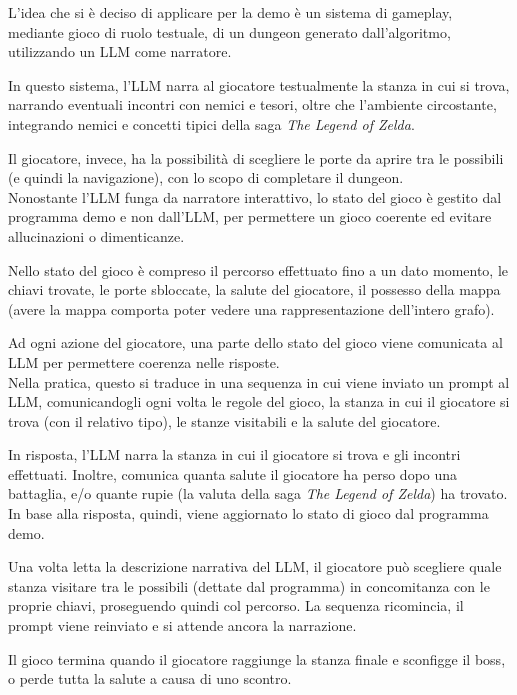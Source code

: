 \documentclass[12pt,titlepage]{article}
\begin{document}
\noindent L'idea che si è deciso di applicare per la demo è un sistema di gameplay, mediante gioco di ruolo testuale, di un dungeon generato dall'algoritmo, utilizzando un LLM come narratore.

In questo sistema, l'LLM narra al giocatore testualmente la stanza in cui si trova, narrando eventuali incontri con nemici e tesori, oltre che l'ambiente circostante, integrando nemici e concetti tipici della saga \textit{The Legend of Zelda}.

Il giocatore, invece, ha la possibilità di scegliere le porte da aprire tra le possibili (e quindi la navigazione), con lo scopo di completare il dungeon.\\

\noindent Nonostante l'LLM funga da narratore interattivo, lo stato del gioco è gestito dal programma demo e non dall'LLM, per permettere un gioco coerente ed evitare allucinazioni o dimenticanze.

Nello stato del gioco è compreso il percorso effettuato fino a un dato momento, le chiavi trovate, le porte sbloccate, la salute del giocatore, il possesso della mappa (avere la mappa comporta poter vedere una rappresentazione dell'intero grafo).

Ad ogni azione del giocatore, una parte dello stato del gioco viene comunicata al LLM per permettere  coerenza nelle risposte.\\

\noindent Nella pratica, questo si traduce in una sequenza in cui viene inviato un prompt al LLM, comunicandogli ogni volta le regole del gioco, la stanza in cui il giocatore si trova (con il relativo tipo), le stanze visitabili e la salute del giocatore.

In risposta, l'LLM narra la stanza in cui il giocatore si trova e gli incontri effettuati. Inoltre, comunica quanta salute il giocatore ha perso dopo una battaglia, e/o quante rupie (la valuta della saga \textit{The Legend of Zelda}) ha trovato. In base alla risposta, quindi, viene aggiornato lo stato di gioco dal programma demo.

Una volta letta la descrizione narrativa del LLM, il giocatore può scegliere quale stanza visitare tra le possibili (dettate dal programma) in concomitanza con le proprie chiavi, proseguendo quindi col percorso. La sequenza ricomincia, il prompt viene reinviato e si attende ancora la narrazione.

Il gioco termina quando il giocatore raggiunge la stanza finale e sconfigge il boss, o perde tutta la salute a causa di uno scontro.\\
\end{document}
